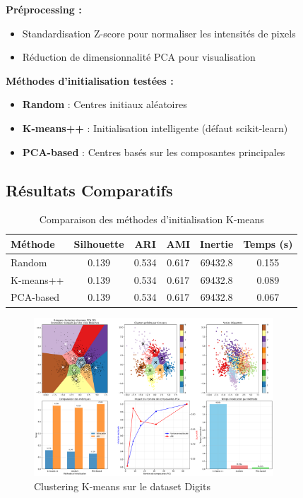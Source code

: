 \documentclass[12pt,a4paper]{article}
\begin{document}
\textbf{Préprocessing :}
\begin{itemize}
    \item Standardisation Z-score pour normaliser les intensités de pixels
    \item Réduction de dimensionnalité PCA pour visualisation
\end{itemize}

\textbf{Méthodes d'initialisation testées :}
\begin{itemize}
    \item \textbf{Random} : Centres initiaux aléatoires
    \item \textbf{K-means++} : Initialisation intelligente (défaut scikit-learn)
    \item \textbf{PCA-based} : Centres basés sur les composantes principales
\end{itemize}

\subsection{Résultats Comparatifs}

\begin{table}[H]
\centering
\begin{tabular}{lccccc}
\toprule
\textbf{Méthode} & \textbf{Silhouette} & \textbf{ARI} & \textbf{AMI} & \textbf{Inertie} & \textbf{Temps (s)} \\
\midrule
Random & 0.139 & 0.534 & 0.617 & 69432.8 & 0.155 \\
K-means++ & 0.139 & 0.534 & 0.617 & 69432.8 & 0.089 \\
PCA-based & 0.139 & 0.534 & 0.617 & 69432.8 & 0.067 \\
\bottomrule
\end{tabular}
\caption{Comparaison des méthodes d'initialisation K-means}
\label{tab:kmeans_init}
\end{table}

\begin{figure}[H]
    \centering
    \includegraphics[width=0.8\textwidth]{exercice3_clustering_digits.png}
    \caption{Clustering K-means sur le dataset Digits}
    \label{fig:digits_clustering}
\end{figure}
\end{document}
